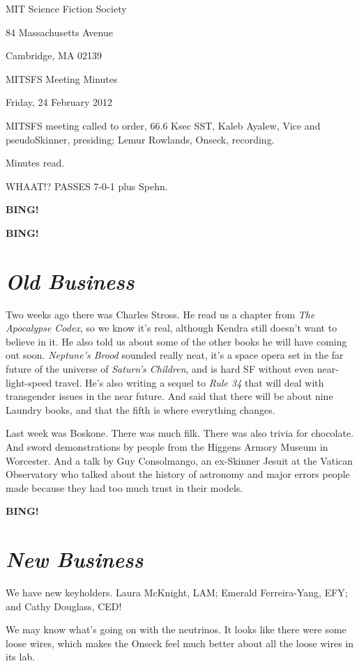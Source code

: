 \documentclass[10pt]{article}
\newcommand{\bing}{{\bf BING!} }
\newcommand{\goto}[1]{\bing \vskip 12pt \section*{{\em{#1}}}}
\newcommand{\ps}{ plus Spehn\xspace}
\newcommand{\skinner}{Kaleb Ayalew, Vice and pseudoSkinner}
\newcommand{\onseck}{Lemur Rowlands, Onseck}
\newcommand{\meetingdate}{Friday, 24 February 2012}
\begin{document}
\begin{center}

MIT Science Fiction Society

84 Massachusetts Avenue

Cambridge, MA 02139

\vspace{12pt}

MITSFS Meeting Minutes

\meetingdate

\end{center}

\vspace{18pt}

\setlength{\parskip}{6pt}

\noindent
MITSFS meeting called to order, 66.6 Ksec SST,
\skinner, presiding; \onseck, recording.

Minutes read.

WHAAT!? PASSES 7-0-1\ps.

\bing


\goto{Old Business}

Two weeks ago there was Charles Stross.  He read us a chapter
from \emph{The Apocalypse Codex}, so we know it's real, although
Kendra still doesn't want to believe in it.  He also told us
about some of the other books he will have coming out soon.
\emph{Neptune's Brood} sounded really neat, it's a space opera
set in the far future of the universe of \emph{Saturn's Children},
and is hard SF without even near-light-speed travel.  He's also
writing a sequel to \emph{Rule 34} that will deal with transgender
issues in the near future.  And said that there will be about
nine Laundry books, and that the fifth is where everything changes.

Last week was Boskone.  There was much filk.  There was also
trivia for chocolate.  And sword demonstrations by people from
the Higgens Armory Museum in Worcester.  And a talk by Guy
Consolmango, an ex-Skinner Jesuit at the Vatican Observatory
who talked about the history of astronomy and major errors people
made because they had too much trust in their models. 


\goto{New Business}

We have new keyholders.  Laura McKnight, LAM; Emerald 
Ferreira-Yang, EFY; and Cathy Douglass, CED!

We may know what's going on with the neutrinos.  It looks like
there were some loose wires, which makes the Onseck feel much
better about all the loose wires in its lab.
\end{document}

